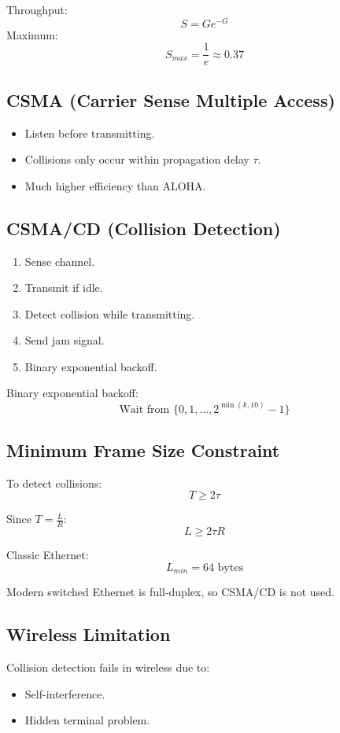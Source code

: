 \documentclass[11pt]{article}
\begin{document}
Throughput:
\[
S = G e^{-G}
\]
Maximum:
\[
S_{max} = \frac{1}{e} \approx 0.37
\]

\subsection{CSMA (Carrier Sense Multiple Access)}
\begin{itemize}
    \item Listen before transmitting.
    \item Collisions only occur within propagation delay $\tau$.
    \item Much higher efficiency than ALOHA.
\end{itemize}

\subsection{CSMA/CD (Collision Detection)}
\begin{enumerate}
    \item Sense channel.
    \item Transmit if idle.
    \item Detect collision while transmitting.
    \item Send jam signal.
    \item Binary exponential backoff.
\end{enumerate}

Binary exponential backoff:
\[
\text{Wait from } \{0,1,\dots,2^{\min(k,10)}-1\}
\]

\subsection{Minimum Frame Size Constraint}

To detect collisions:
\[
T \ge 2\tau
\]

Since $T = \frac{L}{R}$:
\[
L \ge 2\tau R
\]

Classic Ethernet:
\[
L_{min} = 64 \text{ bytes}
\]

Modern switched Ethernet is full-duplex, so CSMA/CD is not used.

\subsection{Wireless Limitation}
Collision detection fails in wireless due to:
\begin{itemize}
    \item Self-interference.
    \item Hidden terminal problem.
\end{itemize}
\end{document}
